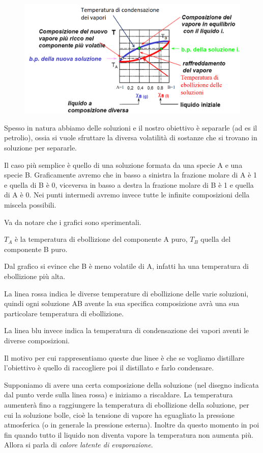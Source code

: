\begin{figure}[htp]
    \centering
    \includegraphics[width=15cm]{immagini/distillazione_ideale.png}
\end{figure}

Spesso in natura abbiamo delle soluzioni e il nostro obiettivo è separarle (ad es il petrolio), ossia si vuole sfruttare la diversa volatilità di sostanze che si trovano in soluzione per separarle.

Il caso più semplice è quello di una soluzione formata da una specie A e una specie B. Graficamente avremo che in basso a sinistra la frazione molare di A è 1 e quella di B è 0, viceversa in basso a destra la frazione molare di B è 1 e quella di A è 0. Nei punti intermedi avremo invece tutte le infinite composizioni della miscela possibili.

Va da notare che i grafici sono sperimentali.

$T_A$ è la temperatura di ebollizione del componente A puro, $T_B$ quella del componente B puro.

Dal grafico si evince che B è meno volatile di A, infatti ha una temperatura di ebollizione più alta.

La linea rossa indica le diverse temperature di ebollizione delle varie soluzioni, quindi ogni soluzione AB avente la sua specifica composizione avrà una sua particolare temperatura di ebollizione.

La linea blu invece indica la temperatura di condensazione dei vapori aventi le diverse composizioni.

Il motivo per cui rappresentiamo queste due linee è che se vogliamo distillare l'obiettivo è quello di raccogliere poi il distillato e farlo condensare.

Supponiamo di avere una certa composizione della soluzione (nel disegno indicata dal punto verde sulla linea rossa) e iniziamo a riscaldare. La temperatura aumenterà fino a raggiungere la temperatura di ebollizione della soluzione, per cui la soluzione bolle, cioè la tensione di vapore ha eguagliato la pressione atmosferica (o in generale la pressione esterna). Inoltre da questo momento in poi fin quando  tutto il liquido non diventa vapore la temperatura non aumenta più. Allora si parla di \textit{calore latente di evaporazione}.

